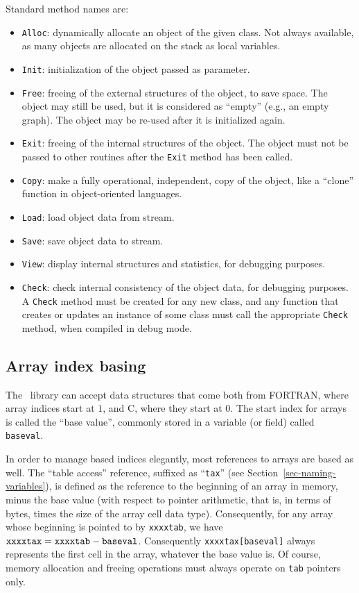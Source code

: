 Standard method names are:
\begin{itemize}
\item
\texttt{Alloc}: dynamically allocate an object of the given class. Not
always available, as many objects are allocated on the stack as local
variables.
\item
\texttt{Init}: initialization of the object passed as parameter.
\item
\texttt{Free}: freeing of the external structures of the object, to save
space. The object may still be used, but it is considered as ``empty''
(e.g., an empty graph). The object may be re-used after it is
initialized again.
\item
\texttt{Exit}: freeing of the internal structures of the object. The
object must not be passed to other routines after the \texttt{Exit}
method has been called.
\item
\texttt{Copy}: make a fully operational, independent, copy of the
object, like a ``clone'' function in object-oriented languages.
\item
\texttt{Load}: load object data from stream.
\item
\texttt{Save}: save object data to stream.
\item
\texttt{View}: display internal structures and statistics, for debugging
purposes.
\item
\texttt{Check}: check internal consistency of the object data, for
debugging purposes. A \texttt{Check} method must be created for any
new class, and any function that creates or updates an instance of
some class must call the appropriate \texttt{Check} method, when
compiled in debug mode.
\end{itemize}

\subsection{Array index basing}
\label{sec-basing}

The \libscotch\ library can accept data structures that come both from
FORTRAN, where array indices start at $1$, and C, where they start at
$0$. The start index for arrays is called the ``base value'', commonly
stored in a variable (or field) called \texttt{baseval}.

In order to manage based indices elegantly, most references to arrays
are based as well. The ``table access'' reference, suffixed as
``\texttt{tax}'' (see Section~\ref{sec-naming-variables}), is defined
as the reference to the beginning of an array in memory, minus the
base value (with respect to pointer arithmetic, that is, in terms of
bytes, times the size of the array cell data type). Consequently, for
any array whose beginning is pointed to by \texttt{xxxxtab}, we have
$\mbox{\texttt{xxxxtax}} = \mbox{\texttt{xxxxtab}} - \mbox{\texttt{baseval}}$.
Consequently \texttt{xxxxtax[baseval]} always represents the first
cell in the array, whatever the base value is.
Of course, memory allocation and freeing operations must always
operate on \texttt{tab} pointers only.

